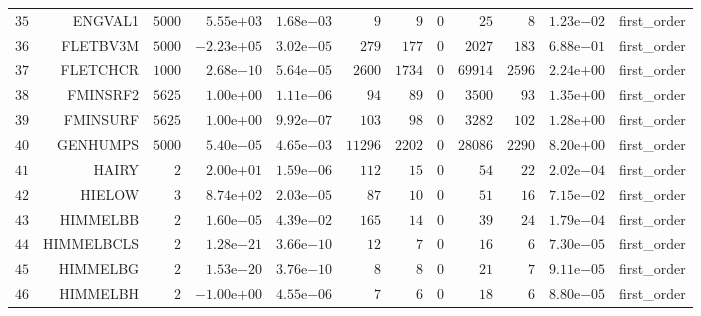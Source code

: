 \begin{longtable}{rrrrrrrrrrrr}
  \(    35\) & ENGVAL1 & \(  5000\) & \( 5.55\)e\(+03\) & \( 1.68\)e\(-03\) & \(     9\) & \(     9\) & \(     0\) & \(    25\) & \(     8\) & \( 1.23\)e\(-02\) & first\_order \\
  \(    36\) & FLETBV3M & \(  5000\) & \(-2.23\)e\(+05\) & \( 3.02\)e\(-05\) & \(   279\) & \(   177\) & \(     0\) & \(  2027\) & \(   183\) & \( 6.88\)e\(-01\) & first\_order \\
  \(    37\) & FLETCHCR & \(  1000\) & \( 2.68\)e\(-10\) & \( 5.64\)e\(-05\) & \(  2600\) & \(  1734\) & \(     0\) & \( 69914\) & \(  2596\) & \( 2.24\)e\(+00\) & first\_order \\
  \(    38\) & FMINSRF2 & \(  5625\) & \( 1.00\)e\(+00\) & \( 1.11\)e\(-06\) & \(    94\) & \(    89\) & \(     0\) & \(  3500\) & \(    93\) & \( 1.35\)e\(+00\) & first\_order \\
  \(    39\) & FMINSURF & \(  5625\) & \( 1.00\)e\(+00\) & \( 9.92\)e\(-07\) & \(   103\) & \(    98\) & \(     0\) & \(  3282\) & \(   102\) & \( 1.28\)e\(+00\) & first\_order \\
  \(    40\) & GENHUMPS & \(  5000\) & \( 5.40\)e\(-05\) & \( 4.65\)e\(-03\) & \( 11296\) & \(  2202\) & \(     0\) & \( 28086\) & \(  2290\) & \( 8.20\)e\(+00\) & first\_order \\
  \(    41\) & HAIRY & \(     2\) & \( 2.00\)e\(+01\) & \( 1.59\)e\(-06\) & \(   112\) & \(    15\) & \(     0\) & \(    54\) & \(    22\) & \( 2.02\)e\(-04\) & first\_order \\
  \(    42\) & HIELOW & \(     3\) & \( 8.74\)e\(+02\) & \( 2.03\)e\(-05\) & \(    87\) & \(    10\) & \(     0\) & \(    51\) & \(    16\) & \( 7.15\)e\(-02\) & first\_order \\
  \(    43\) & HIMMELBB & \(     2\) & \( 1.60\)e\(-05\) & \( 4.39\)e\(-02\) & \(   165\) & \(    14\) & \(     0\) & \(    39\) & \(    24\) & \( 1.79\)e\(-04\) & first\_order \\
  \(    44\) & HIMMELBCLS & \(     2\) & \( 1.28\)e\(-21\) & \( 3.66\)e\(-10\) & \(    12\) & \(     7\) & \(     0\) & \(    16\) & \(     6\) & \( 7.30\)e\(-05\) & first\_order \\
  \(    45\) & HIMMELBG & \(     2\) & \( 1.53\)e\(-20\) & \( 3.76\)e\(-10\) & \(     8\) & \(     8\) & \(     0\) & \(    21\) & \(     7\) & \( 9.11\)e\(-05\) & first\_order \\
  \(    46\) & HIMMELBH & \(     2\) & \(-1.00\)e\(+00\) & \( 4.55\)e\(-06\) & \(     7\) & \(     6\) & \(     0\) & \(    18\) & \(     6\) & \( 8.80\)e\(-05\) & first\_order \\

\end{longtable}
